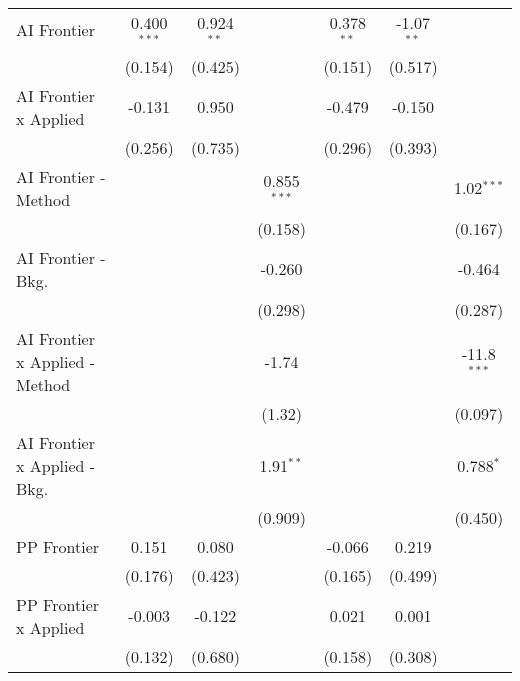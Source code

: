 \begin{tabular}{lcccccc}
   AI Frontier                    & 0.400$^{***}$ & 0.924$^{**}$ &               & 0.378$^{**}$  & -1.07$^{**}$ &   \\   
                                  & (0.154)       & (0.425)      &               & (0.151)       & (0.517)      &   \\   
   AI Frontier x Applied          & -0.131        & 0.950        &               & -0.479        & -0.150       &   \\   
                                  & (0.256)       & (0.735)      &               & (0.296)       & (0.393)      &   \\   
   AI Frontier - Method           &               &              & 0.855$^{***}$ &               &              & 1.02$^{***}$\\   
                                  &               &              & (0.158)       &               &              & (0.167)\\   
   AI Frontier - Bkg.             &               &              & -0.260        &               &              & -0.464\\   
                                  &               &              & (0.298)       &               &              & (0.287)\\   
   AI Frontier x Applied - Method &               &              & -1.74         &               &              & -11.8$^{***}$\\   
                                  &               &              & (1.32)        &               &              & (0.097)\\   
   AI Frontier x Applied - Bkg.   &               &              & 1.91$^{**}$   &               &              & 0.788$^{*}$\\   
                                  &               &              & (0.909)       &               &              & (0.450)\\   
   PP Frontier                    & 0.151         & 0.080        &               & -0.066        & 0.219        &   \\   
                                  & (0.176)       & (0.423)      &               & (0.165)       & (0.499)      &   \\   
   PP Frontier x Applied          & -0.003        & -0.122       &               & 0.021         & 0.001        &   \\   
                                  & (0.132)       & (0.680)      &               & (0.158)       & (0.308)      &   \\   

\end{tabular}

